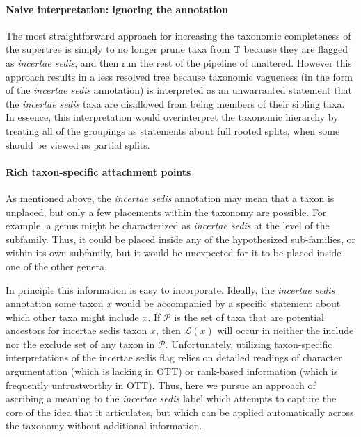 \documentclass[english]{article}
\begin{document}
\paragraph{Naive interpretation: ignoring the annotation}

The most straightforward approach for increasing the taxonomic
completeness of the supertree is simply to no longer prune taxa from
$\mbox{\ensuremath{\mathbb{T}}}$ because they are flagged as \emph{incertae sedis}, and
then run the rest of the pipeline of \citet{redelings2017supertree}
unaltered.
However this approach results in a less resolved tree
because taxonomic vagueness (in the form of the \emph{incertae sedis}
annotation) is interpreted as an unwarranted statement that the
\emph{incertae sedis} taxa are disallowed from being members of their
sibling taxa.
In essence, this interpretation would overinterpret the taxonomic
    hierarchy by treating all of the groupings as statements about
    full rooted splits, when some should be viewed as partial splits.


\paragraph{Rich taxon-specific attachment points}

As mentioned above, the \emph{incertae sedis} annotation may mean that a taxon is
unplaced, but only a few placements within the taxonomy are possible.
For example, a genus might be characterized as \emph{incertae sedis}
at the level of the subfamily.
Thus, it could be placed inside any of the
hypothesized sub-families, or within its own subfamily, but it would
be unexpected for it to be placed inside one of the other genera.

In principle this information is easy to incorporate.
Ideally, the \emph{incertae sedis}
annotation some taxon $x$ would be accompanied by a specific
statement about which other taxa might include $x$.
If $\mathcal{P}$ is the set of taxa that are potential ancestors for
incertae sedis taxon $x$, then $\mathcal{L}(x)$ will occur in neither
the include nor the exclude set of any taxon in $\mathcal{P}$.
Unfortunately, utilizing taxon-specific interpretations of the
incertae sedis flag relies on detailed readings of character argumentation
(which is lacking in OTT) or rank-based information (which is frequently
untrustworthy in OTT).
Thus, here we pursue an approach of ascribing a
meaning to the \emph{incertae sedis} label which attempts to capture
the core of the idea that it articulates, but which can be applied
automatically across the taxonomy without additional information.
\end{document}
